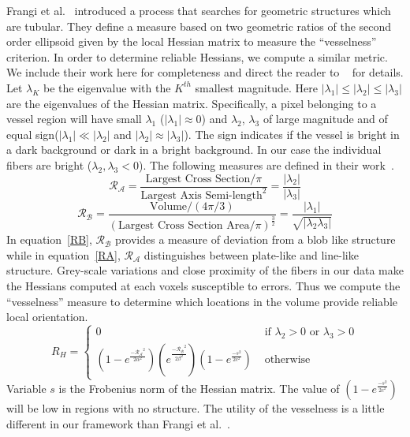 Frangi et al.~\cite{Frangi1998} introduced a process that searches for geometric structures which are tubular. They define a measure based on two geometric ratios of the second order ellipsoid given by the local Hessian matrix to measure the ``vesselness'' criterion.  In order to determine reliable Hessians, we compute a similar metric. We include their work here for completeness and direct the reader to ~\cite{Frangi1998} for details. Let $\lambda_{K}$ be the eigenvalue with the $K^{th}$ smallest magnitude. Here $|{\lambda}_{1}| \leq| {\lambda}_{2}|\leq| {\lambda}_{3}| $ are the eigenvalues of the Hessian matrix. Specifically, a pixel belonging to a vessel region will have small $\lambda_{1}$ ($|\lambda_{1}|\approx 0$) and $\lambda_{2}$, $\lambda_{3}$ of large magnitude and of equal sign($|\lambda_{1}| \ll |\lambda_{2}|$ and $|\lambda_{2}|\approx |\lambda_{3}|$). The sign indicates if the vessel is bright in a dark background or dark in a bright background. In our case the individual fibers are bright ($\lambda_2,\lambda_3 < 0$). The following measures are defined in their work~\cite{Frangi1998}.  
\begin{equation}\label{RA}
\mathcal{R_{A}}=\frac{\textrm{Largest  Cross Section}\big/ \pi}{{\textrm{Largest Axis Semi-length}}^{2}}=\frac{|\lambda_{2}|}{|\lambda_{3}|}
\end{equation}
\begin{equation}\label{RB}
\mathcal{R_{B}}=\frac{\textrm{Volume}\big/ (4\pi \big/ 3)}{{(\textrm{Largest Cross Section Area}\big/ \pi)}^{\frac{3}{2}}}=\frac{|\lambda_{1}|}{\sqrt{|\lambda_{2}\lambda_{3}|}}
\end{equation}
In equation~\ref{RB}, $\mathcal{R_{B}}$ provides a measure of deviation from a blob like structure while in equation~\ref{RA}, $\mathcal{R_{A}}$ distinguishes between plate-like and line-like structure. Grey-scale variations and close proximity of the fibers in our data make the Hessians computed at each voxels susceptible to errors. Thus we compute the ``vesselness'' measure to determine which locations in the volume provide reliable local orientation.
$$
R_{H} = \left\{ \begin{array}{ccc}
 0 & \mbox{ if $\lambda_{2}>0$ or $\lambda_{3}>0$} \\
  (1-e^{\frac{\mathcal{-R_{A}}^{2}}{2\alpha^{2}}})
  (e^{\frac{\mathcal{-R_{B}}^{2}}{2\beta^{2}}}) (1-e^{\frac{-s^2}{2c^2}}) &\mbox{ otherwise}
       \end{array} \right.
$$
Variable $s$ is the Frobenius norm of the Hessian matrix. The value of $(1-e^{\frac{-s^2}{2c^2}})$ will be low in regions with no structure. The utility of the vesselness is a little different in our framework than Frangi et al.~\cite{Frangi1998}.

